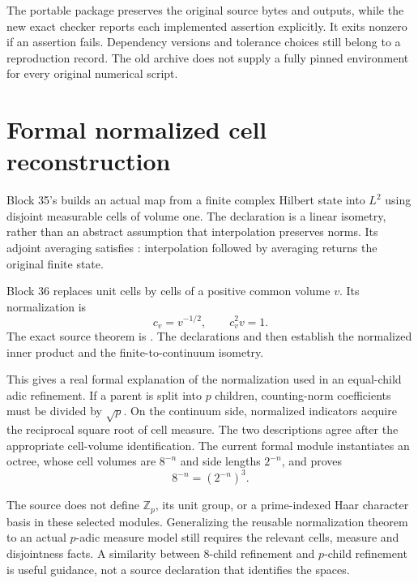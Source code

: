 The portable package preserves the original source bytes and outputs, while the new exact checker reports each implemented assertion explicitly. It exits nonzero if an assertion fails. Dependency versions and tolerance choices still belong to a reproduction record. The old archive does not supply a fully pinned environment for every original numerical script.

\clearpage
\section{Formal normalized cell reconstruction}\label{a-verify-formal-cells}

Block 35's  builds an actual map from a finite complex Hilbert state into \(L^2\) using disjoint measurable cells of volume one. The declaration  is a linear isometry, rather than an abstract assumption that interpolation preserves norms. Its adjoint averaging satisfies : interpolation followed by averaging returns the original finite state.

Block 36 replaces unit cells by cells of a positive common volume \(v\). Its normalization is
\[
 c_v=v^{-1/2},\qquad c_v^2v=1.
\]
The exact source theorem is . The declarations  and  then establish the normalized inner product and the finite-to-continuum isometry.

This gives a real formal explanation of the normalization used in an equal-child adic refinement. If a parent is split into \(p\) children, counting-norm coefficients must be divided by \(\sqrt p\). On the continuum side, normalized indicators acquire the reciprocal square root of cell measure. The two descriptions agree after the appropriate cell-volume identification. The current formal module instantiates an octree, whose cell volumes are \(8^{-n}\) and side lengths \(2^{-n}\), and proves
\[
 8^{-n}=(2^{-n})^3.
\]

The source does not define \(\mathbb Z_p\), its unit group, or a prime-indexed Haar character basis in these selected modules. Generalizing the reusable normalization theorem to an actual \(p\)-adic measure model still requires the relevant cells, measure and disjointness facts. A similarity between \(8\)-child refinement and \(p\)-child refinement is useful guidance, not a source declaration that identifies the spaces.

